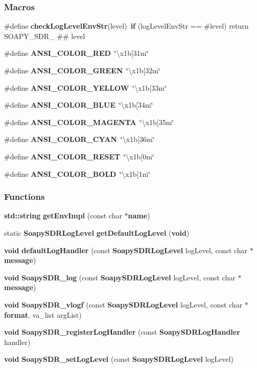 \subsubsection*{Macros}
\begin{DoxyCompactItemize}
\item 
\#define {\bf check\+Log\+Level\+Env\+Str}(level)~{\bf if} (log\+Level\+Env\+Str == \#level) return S\+O\+A\+P\+Y\+\_\+\+S\+D\+R\+\_\+ \#\# level
\item 
\#define {\bf A\+N\+S\+I\+\_\+\+C\+O\+L\+O\+R\+\_\+\+R\+ED}~\char`\"{}\textbackslash{}x1b[31m\char`\"{}
\item 
\#define {\bf A\+N\+S\+I\+\_\+\+C\+O\+L\+O\+R\+\_\+\+G\+R\+E\+EN}~\char`\"{}\textbackslash{}x1b[32m\char`\"{}
\item 
\#define {\bf A\+N\+S\+I\+\_\+\+C\+O\+L\+O\+R\+\_\+\+Y\+E\+L\+L\+OW}~\char`\"{}\textbackslash{}x1b[33m\char`\"{}
\item 
\#define {\bf A\+N\+S\+I\+\_\+\+C\+O\+L\+O\+R\+\_\+\+B\+L\+UE}~\char`\"{}\textbackslash{}x1b[34m\char`\"{}
\item 
\#define {\bf A\+N\+S\+I\+\_\+\+C\+O\+L\+O\+R\+\_\+\+M\+A\+G\+E\+N\+TA}~\char`\"{}\textbackslash{}x1b[35m\char`\"{}
\item 
\#define {\bf A\+N\+S\+I\+\_\+\+C\+O\+L\+O\+R\+\_\+\+C\+Y\+AN}~\char`\"{}\textbackslash{}x1b[36m\char`\"{}
\item 
\#define {\bf A\+N\+S\+I\+\_\+\+C\+O\+L\+O\+R\+\_\+\+R\+E\+S\+ET}~\char`\"{}\textbackslash{}x1b[0m\char`\"{}
\item 
\#define {\bf A\+N\+S\+I\+\_\+\+C\+O\+L\+O\+R\+\_\+\+B\+O\+LD}~\char`\"{}\textbackslash{}x1b[1m\char`\"{}
\end{DoxyCompactItemize}
\subsubsection*{Functions}
\begin{DoxyCompactItemize}
\item 
{\bf std\+::string} {\bf get\+Env\+Impl} (const char $\ast${\bf name})
\item 
static {\bf Soapy\+S\+D\+R\+Log\+Level} {\bf get\+Default\+Log\+Level} ({\bf void})
\item 
{\bf void} {\bf default\+Log\+Handler} (const {\bf Soapy\+S\+D\+R\+Log\+Level} log\+Level, const char $\ast${\bf message})
\item 
{\bf void} {\bf Soapy\+S\+D\+R\+\_\+log} (const {\bf Soapy\+S\+D\+R\+Log\+Level} log\+Level, const char $\ast${\bf message})
\item 
{\bf void} {\bf Soapy\+S\+D\+R\+\_\+vlogf} (const {\bf Soapy\+S\+D\+R\+Log\+Level} log\+Level, const char $\ast${\bf format}, va\+\_\+list arg\+List)
\item 
{\bf void} {\bf Soapy\+S\+D\+R\+\_\+register\+Log\+Handler} (const {\bf Soapy\+S\+D\+R\+Log\+Handler} handler)
\item 
{\bf void} {\bf Soapy\+S\+D\+R\+\_\+set\+Log\+Level} (const {\bf Soapy\+S\+D\+R\+Log\+Level} log\+Level)
\end{DoxyCompactItemize}

